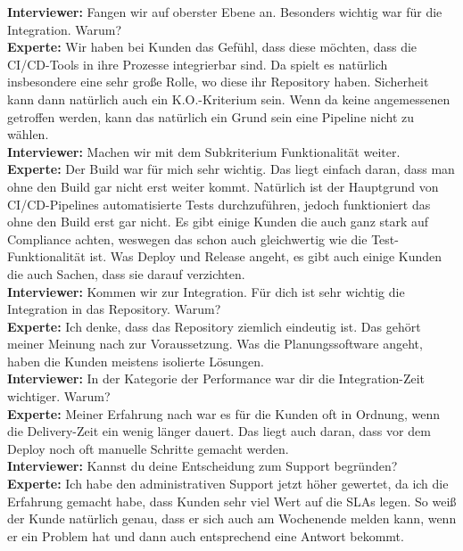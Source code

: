 \begin{center}
\begin{figure}[H]
    \centering
    \label{fig:CEA}
\end{figure}	
\end{center}
\newpage
\resetlinenumber
\begin{linenumbers}
    \textbf{Interviewer:} Fangen wir auf oberster Ebene an. Besonders wichtig war für die Integration. Warum?\\
    \textbf{Experte:} Wir haben bei Kunden das Gefühl, dass diese möchten, dass die CI/CD-Tools in ihre Prozesse integrierbar sind. Da spielt es natürlich insbesondere eine sehr große Rolle, wo diese ihr Repository haben. Sicherheit kann dann natürlich auch ein K.O.-Kriterium sein. Wenn da keine angemessenen getroffen werden, kann das natürlich ein Grund sein eine Pipeline nicht zu wählen. \\
    \textbf{Interviewer:} Machen wir mit dem Subkriterium Funktionalität weiter.\\
    \textbf{Experte:} Der Build war für mich sehr wichtig. Das liegt einfach daran, dass man ohne den Build gar nicht erst weiter kommt. Natürlich ist der Hauptgrund von CI/CD-Pipelines automatisierte Tests durchzuführen, jedoch funktioniert das ohne den Build erst gar nicht. Es gibt einige Kunden die auch ganz stark auf Compliance achten, weswegen das schon auch gleichwertig wie die Test-Funktionalität ist. Was Deploy und Release angeht, es gibt auch einige Kunden die auch Sachen, dass sie darauf verzichten.\\
    \textbf{Interviewer:} Kommen wir zur Integration. Für dich ist sehr wichtig die Integration in das Repository. Warum?\\
    \textbf{Experte:} Ich denke, dass das Repository ziemlich eindeutig ist. Das gehört meiner Meinung nach zur Voraussetzung. Was die Planungssoftware angeht, haben die Kunden meistens isolierte Lösungen.\\ 
    \textbf{Interviewer:} In der Kategorie der Performance war dir die Integration-Zeit wichtiger. Warum?\\
    \textbf{Experte:} Meiner Erfahrung nach war es für die Kunden oft in Ordnung, wenn die Delivery-Zeit ein wenig länger dauert. Das liegt auch daran, dass vor dem Deploy noch oft manuelle Schritte gemacht werden.\\
    \textbf{Interviewer:} Kannst du deine Entscheidung zum Support begründen?\\
    \textbf{Experte:} Ich habe den administrativen Support jetzt höher gewertet, da ich die Erfahrung gemacht habe, dass Kunden sehr viel Wert auf die SLAs legen. So weiß der Kunde natürlich genau, dass er sich auch am Wochenende melden kann, wenn er ein Problem hat und dann auch entsprechend eine Antwort bekommt. \\

\end{linenumbers}
